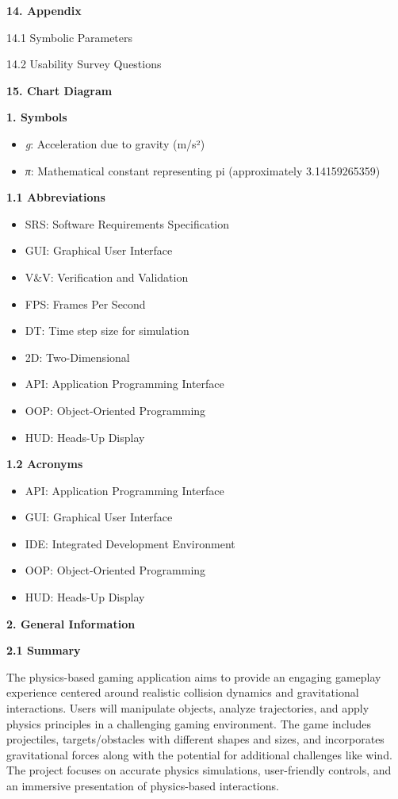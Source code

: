 \documentclass[
]{article}
\begin{document}
\textbf{14. Appendix}

14.1 Symbolic Parameters

14.2 Usability Survey Questions

\textbf{15. Chart Diagram}

\textbf{1. Symbols}

\begin{itemize}
\item
  \emph{g}: Acceleration due to gravity (m/s²)
\item
  \emph{π}: Mathematical constant representing pi (approximately
  3.14159265359)
\end{itemize}

\textbf{1.1 Abbreviations}

\begin{itemize}
\item
  SRS: Software Requirements Specification
\item
  GUI: Graphical User Interface
\item
  V\&V: Verification and Validation
\item
  FPS: Frames Per Second
\item
  DT: Time step size for simulation
\item
  2D: Two-Dimensional
\item
  API: Application Programming Interface
\item
  OOP: Object-Oriented Programming
\item
  HUD: Heads-Up Display
\end{itemize}

\textbf{1.2 Acronyms}

\begin{itemize}
\item
  API: Application Programming Interface
\item
  GUI: Graphical User Interface
\item
  IDE: Integrated Development Environment
\item
  OOP: Object-Oriented Programming
\item
  HUD: Heads-Up Display
\end{itemize}

\textbf{2. General Information}

\textbf{2.1 Summary}

The physics-based gaming application aims to provide an engaging
gameplay experience centered around realistic collision dynamics and
gravitational interactions. Users will manipulate objects, analyze
trajectories, and apply physics principles in a challenging gaming
environment. The game includes projectiles, targets/obstacles with
different shapes and sizes, and incorporates gravitational forces along
with the potential for additional challenges like wind. The project
focuses on accurate physics simulations, user-friendly controls, and an
immersive presentation of physics-based interactions.
\end{document}
